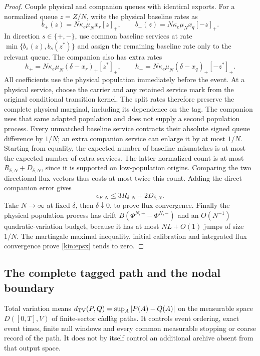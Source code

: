\documentclass[11pt]{article}
\theoremstyle{definition}\newtheorem{definition}[theorem]{Definition}
\theoremstyle{remark}\newtheorem{remark}[theorem]{Remark}
\begin{document}
\begin{proof}
Couple physical and companion queues with identical exports. For a normalized queue $z=Z/N$, write the physical baseline rates as
\[
 b_+(z)=N\kappa_e\mu_Nx_r[z]_+,\qquad
 b_-(z)=N\kappa_e\mu_Nx_q[-z]_+.
\]
In direction $s\in\{+,-\}$, use common baseline services at rate $\min\{b_s(z),b_s(z^*)\}$ and assign the remaining baseline rate only to the relevant queue. The companion also has extra rates
\[
 h_+=N\kappa_e\mu_N(\delta-x_r)_+[z^*]_+,\qquad
 h_-=N\kappa_e\mu_N(\delta-x_q)_+[-z^*]_+.
\]
All coefficients use the physical population immediately before the event. At a physical service, choose the carrier and any retained service mark from the original conditional transition kernel. The split rates therefore preserve the complete physical marginal, including its dependence on the tag. The companion uses that same adapted population and does not supply a second population process. Every unmatched baseline service contracts their absolute signed queue
difference by $1/N$; an extra companion service can enlarge it by at most
$1/N$. Starting from equality, the expected number of baseline mismatches
is at most the expected number of extra services. The latter normalized
count is at most $R_{\delta,N}+D_{\delta,N}$, since it is supported on
low-population origins. Comparing the two directional flux vectors thus
costs at most twice this count. Adding the direct companion error gives
\begin{equation}
 \epsilon_{F,N}\le3R_{\delta,N}+2D_{\delta,N}.
 \label{kin:fluxbridge}
\end{equation}
Take $N\to\infty$ at fixed $\delta$, then $\delta\downarrow0$, to prove
flux convergence. Finally the physical population process has drift
$B(\Phi^{N,+}-\Phi^{N,-})$ and an $O(N^{-1})$ quadratic-variation budget,
because it has at most $NL+O(1)$ jumps of size $1/N$. The martingale
maximal inequality, initial calibration and integrated flux convergence
prove \eqref{kin:epsx} tends to zero.
\end{proof}

\subsection{The complete tagged path and the nodal boundary}
Total variation means $d_{\mathrm{TV}}(P,Q)=\sup_A|P(A)-Q(A)|$ on the measurable
space $D([0,T],V)$ of finite-sector c\`adl\`ag paths. It controls event
ordering, exact event times, finite null windows and every common measurable
stopping or coarse record of the path. It does not by itself control an
additional archive absent from that output space.
\end{document}
